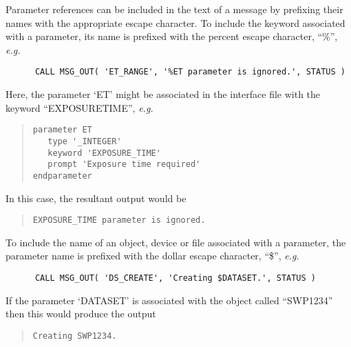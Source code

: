 \documentclass[twoside,11pt]{article}
\renewcommand{\_}{\texttt{\symbol{95}}}
\begin{document}
Parameter references can be included in the text of a message by prefixing 
their names with the appropriate escape character. 
To include the keyword associated with a parameter, its name is prefixed with
the percent escape character, ``\%'', \textit{e.g.}

\begin {small}
\begin{verbatim}
      CALL MSG_OUT( 'ET_RANGE', '%ET parameter is ignored.', STATUS )
\end{verbatim}
\end {small}

\begin {sloppypar}
Here, the parameter `ET' might be associated in the interface file 
with the keyword ``EXPOSURE\_TIME'', \textit{e.g.}
\end {sloppypar}

\begin {quote}
\begin {small}
\begin{verbatim}
parameter ET
   type '_INTEGER'
   keyword 'EXPOSURE_TIME'
   prompt 'Exposure time required'
endparameter
\end{verbatim}
\end {small}
\end {quote}

In this case, the resultant output would be

\begin {quote}
\begin {small}
\begin{verbatim}
EXPOSURE_TIME parameter is ignored.
\end{verbatim}
\end {small}
\end {quote}

To include the name of an object, device or file associated with a parameter, 
the parameter name is prefixed with the dollar escape character, ``\$'',
\textit{e.g.}

\begin {small}
\begin{verbatim}
      CALL MSG_OUT( 'DS_CREATE', 'Creating $DATASET.', STATUS )
\end{verbatim}
\end {small}

If the parameter `DATASET' is associated with the object called ``SWP1234'' 
then this would produce the output

\begin {quote}
\begin {small}
\begin{verbatim}
Creating SWP1234.
\end{verbatim}
\end {small}
\end {quote}
\end{document}
